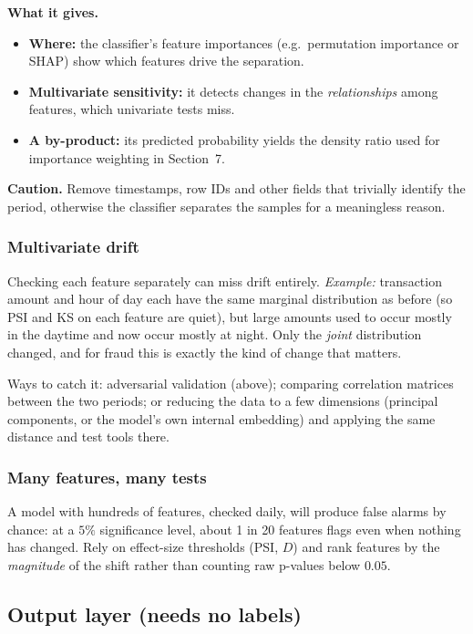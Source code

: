 \documentclass[11pt]{article}
\begin{document}
\textbf{What it gives.}
\begin{itemize}
    \item \textbf{Where:} the classifier's feature importances (e.g.\ permutation importance or SHAP) show which features drive the separation.
    \item \textbf{Multivariate sensitivity:} it detects changes in the \emph{relationships} among features, which univariate tests miss.
    \item \textbf{A by-product:} its predicted probability yields the density ratio used for importance weighting in Section~7.
\end{itemize}

\textbf{Caution.} Remove timestamps, row IDs and other fields that trivially identify the period, otherwise the classifier separates the samples for a meaningless reason.

\subsubsection{Multivariate drift}

Checking each feature separately can miss drift entirely. \emph{Example:} transaction amount and hour of day each have the same marginal distribution as before (so PSI and KS on each feature are quiet), but large amounts used to occur mostly in the daytime and now occur mostly at night. Only the \emph{joint} distribution changed, and for fraud this is exactly the kind of change that matters.

Ways to catch it: adversarial validation (above); comparing correlation matrices between the two periods; or reducing the data to a few dimensions (principal components, or the model's own internal embedding) and applying the same distance and test tools there.

\subsubsection{Many features, many tests}

A model with hundreds of features, checked daily, will produce false alarms by chance: at a \(5\%\) significance level, about 1 in 20 features flags even when nothing has changed. Rely on effect-size thresholds (PSI, \(D\)) and rank features by the \emph{magnitude} of the shift rather than counting raw p-values below \(0.05\).

\subsection{Output layer (needs no labels)}
\end{document}
